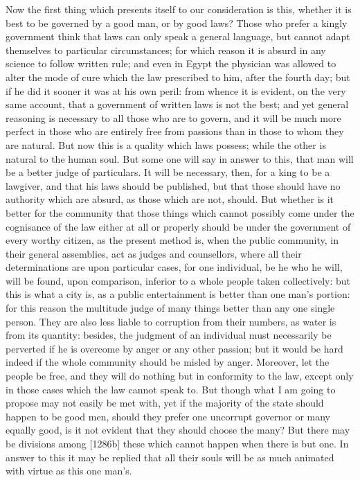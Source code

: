 Now the first thing which presents itself to our consideration is this,
whether it is best to be governed by a good man, or by good laws? Those
who prefer a kingly government think that laws can only speak a general
language, but cannot adapt themselves to particular circumstances; for
which reason it is absurd in any science to follow written rule; and even
in Egypt the physician was allowed to alter the mode of cure which the law
prescribed to him, after the fourth day; but if he did it sooner it was at
his own peril: from whence it is evident, on the very same account, that a
government of written laws is not the best; and yet general reasoning is
necessary to all those who are to govern, and it will be much more perfect
in those who are entirely free from passions than in those to whom they
are natural. But now this is a quality which laws possess; while the other
is natural to the human soul. But some one will say in answer to this,
that man will be a better judge of particulars. It will be necessary,
then, for a king to be a lawgiver, and that his laws should be published,
but that those should have no authority which are absurd, as those which
are not, should. But whether is it better for the community that those
things which cannot possibly come under the cognisance of the law either
at all or properly should be under the government of every worthy citizen,
as the present method is, when the public community, in their general
assemblies, act as judges and counsellors, where all their determinations
are upon particular cases, for one individual, be he who he will, will be
found, upon comparison, inferior to a whole people taken collectively: but
this is what a city is, as a public entertainment is better than one man's
portion: for this reason the multitude judge of many things better than
any one single person. They are also less liable to corruption from their
numbers, as water is from its quantity: besides, the judgment of an
individual must necessarily be perverted if he is overcome by anger or any
other passion; but it would be hard indeed if the whole community should
be misled by anger. Moreover, let the people be free, and they will do
nothing but in conformity to the law, except only in those cases which the
law cannot speak to. But though what I am going to propose may not easily
be met with, yet if the majority of the state should happen to be good
men, should they prefer one uncorrupt governor or many equally good, is it
not evident that they should choose the many? But there may be divisions
among [1286b] these which cannot happen when there is but one. In answer
to this it may be replied that all their souls will be as much animated
with virtue as this one man's.

